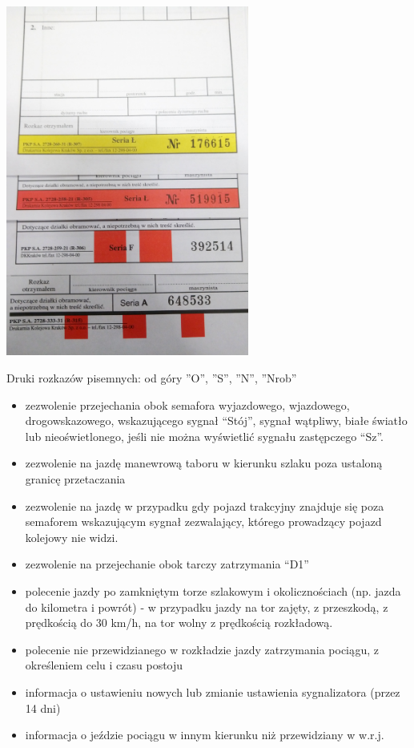 	\begin{marginfigure}
		\includegraphics[width=8cm]{skryptkierownik-img/rozkazy-pisemne.jpg}
		\caption{Druki rozkazów pisemnych: od góry ''O'', ''S'', ''N'', ''Nrob''}
	\end{marginfigure}
\begin{itemize}
\item zezwolenie przejechania obok semafora wyjazdowego, wjazdowego, drogowskazowego, wskazującego sygnał “Stój”, sygnał
wątpliwy, białe światło lub nieoświetlonego, jeśli nie można wyświetlić sygnału zastępczego “Sz”.
\item zezwolenie na jazdę manewrową taboru w kierunku szlaku poza ustaloną granicę przetaczania
\item zezwolenie na jazdę w przypadku gdy pojazd trakcyjny znajduje się poza semaforem wskazującym sygnał zezwalający,
którego prowadzący pojazd kolejowy nie widzi.
\item zezwolenie na przejechanie obok tarczy zatrzymania “D1”
\item polecenie jazdy po zamkniętym torze szlakowym i okolicznościach (np. jazda do kilometra i powrót) - w przypadku jazdy na tor zajęty, z przeszkodą, z prędkością do 30 km/h, na tor wolny z prędkością rozkładową.
\item polecenie nie przewidzianego w rozkładzie jazdy zatrzymania pociągu, z określeniem celu i czasu postoju
\item informacja o ustawieniu nowych lub zmianie ustawienia sygnalizatora (przez 14 dni)
\item informacja o jeździe pociągu w innym kierunku niż przewidziany w w.r.j.
\end{itemize}

